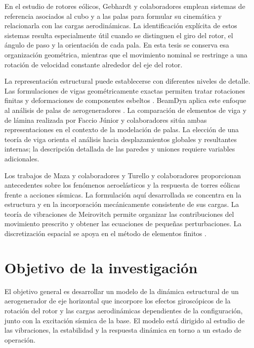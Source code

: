 En el estudio de rotores eólicos, Gebhardt y colaboradores \cite{gebhardt2008} emplean sistemas de referencia asociados al cubo y a las palas para formular su cinemática y relacionarla con las cargas aerodinámicas. La identificación explícita de estos sistemas resulta especialmente útil cuando se distinguen el giro del rotor, el ángulo de paso y la orientación de cada pala. En esta tesis se conserva esa organización geométrica, mientras que el movimiento nominal se restringe a una rotación de velocidad constante alrededor del eje del rotor.

La representación estructural puede establecerse con diferentes niveles de detalle. Las formulaciones de vigas geométricamente exactas permiten tratar rotaciones finitas y deformaciones de componentes esbeltos \cite{simo1985}. BeamDyn aplica este enfoque al análisis de palas de aerogeneradores \cite{wang2017}. La comparación de elementos de viga y de lámina realizada por Faccio Júnior y colaboradores \cite{faccio2019} sitúa ambas representaciones en el contexto de la modelación de palas. La elección de una teoría de viga orienta el análisis hacia desplazamientos globales y resultantes internas; la descripción detallada de las paredes y uniones requiere variables adicionales.

Los trabajos de Maza y colaboradores \cite{maza2017} y Turello y colaboradores \cite{turello2023} proporcionan antecedentes sobre los fenómenos aeroelásticos y la respuesta de torres eólicas frente a acciones sísmicas. La formulación aquí desarrollada se concentra en la estructura y en la incorporación mecánicamente consistente de sus cargas. La teoría de vibraciones de Meirovitch \cite{meirovitch} permite organizar las contribuciones del movimiento prescrito y obtener las ecuaciones de pequeñas perturbaciones. La discretización espacial se apoya en el método de elementos finitos \cite{reddy}.

\section{Objetivo de la investigación}
El objetivo general es desarrollar un modelo de la dinámica estructural de un aerogenerador de eje horizontal que incorpore los efectos giroscópicos de la rotación del rotor y las cargas aerodinámicas dependientes de la configuración, junto con la excitación sísmica de la base. El modelo está dirigido al estudio de las vibraciones, la estabilidad y la respuesta dinámica en torno a un estado de operación.

